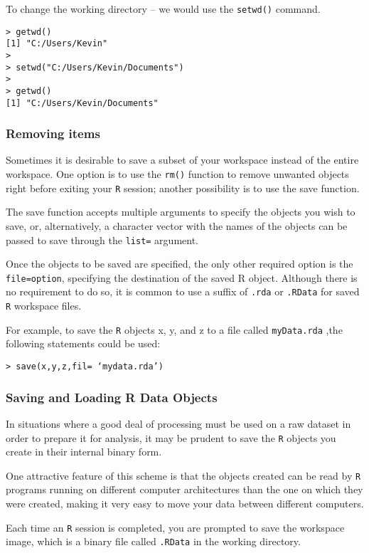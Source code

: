 \documentclass{beamer}
\begin{document}
\begin{frame}[fragile]
To change the working directory – we would use the \texttt{setwd()} command.
\begin{framed}
\begin{verbatim}
> getwd()
[1] "C:/Users/Kevin"
>
> setwd("C:/Users/Kevin/Documents")
>
> getwd()
[1] "C:/Users/Kevin/Documents"
\end{verbatim}
\end{framed}
\end{frame}
\begin{frame}[fragile]

\frametitle{Removing items}
Sometimes it is desirable to save a subset of your workspace instead of the entire workspace. One option is to use the \texttt{rm()} function to remove unwanted objects right before exiting your \texttt{R} session; another possibility is to use the save function. 
\end{frame}
\begin{frame}[fragile]
The save function accepts multiple arguments to specify the objects you wish to save, or, alternatively, a character vector with the names of the objects can be passed to save through the \texttt{list=} argument. 

Once the objects to be saved are specified, the only other required option is the \texttt{file=option}, specifying the destination of the saved R object. Although there is no requirement to do so, it is common to use a suffix of \texttt{.rda} or \texttt{.RData} for saved \texttt{R} workspace files.

For example, to save the \texttt{R} objects x, y, and z to a file called \texttt{myData.rda} ,the following statements could be used:

\begin{verbatim}
> save(x,y,z,fil= ‘mydata.rda’)
\end{verbatim}
\end{frame}
\begin{frame}[fragile]
\frametitle{Saving and Loading R Data Objects}
In situations where a good deal of processing must be used on a raw dataset in order to prepare it for analysis, it may be prudent to save the \texttt{R} objects you create in their internal binary form. 

One attractive feature of this scheme is that the objects created can be read by \texttt{R} programs running on different computer architectures than the one on which they were created, making it very easy to move your data between different computers. 

Each time an \texttt{R} session is completed, you are prompted to save the workspace image, which is a binary file called \texttt{.RData} in the working directory. 
\end{frame}
\end{document}
